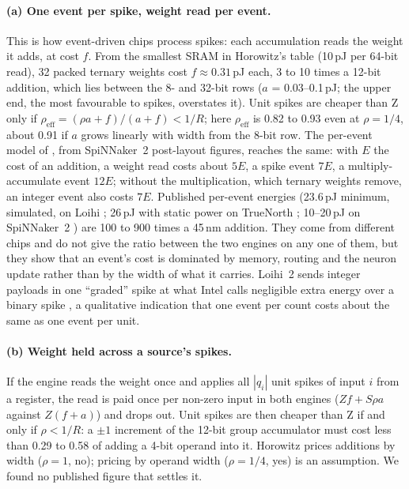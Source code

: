 \documentclass[11pt]{article}
\newcommand{\rhoeff}{\rho_{\mathrm{eff}}}
\begin{document}
\paragraph{(a) One event per spike, weight read per event.} This is how event-driven chips
process spikes: each accumulation reads the weight it adds, at cost $f$. From the smallest SRAM in
Horowitz's table (10\,pJ per 64-bit read), 32 packed ternary weights cost $f \approx 0.31$\,pJ
each, 3 to 10 times a 12-bit addition, which lies between the 8- and 32-bit rows ($a$ =
0.03--0.1\,pJ; the upper end, the most favourable to spikes, overstates it). Unit spikes are
cheaper than Z only if $\rhoeff = (\rho a + f)/(a + f) < 1/R$; here $\rhoeff$ is 0.82 to 0.93
even at $\rho = 1/4$, about 0.91 if $a$ grows linearly with width from the 8-bit row.
The per-event model of \citet{davidson2021}, from SpiNNaker~2 post-layout figures, reaches the
same: with $E$ the cost of an addition, a weight read costs about $5E$, a spike event $7E$, a
multiply-accumulate event $12E$; without the multiplication, which ternary weights remove, an
integer event also costs $7E$. Published per-event energies (23.6\,pJ minimum, simulated, on
Loihi \citep{davies2018loihi}; 26\,pJ with static power on TrueNorth
\citep{merolla2014truenorth}; 10--20\,pJ on SpiNNaker~2 \citep{hoppner2021spinnaker2}) are 100
to 900 times a 45\,nm addition. They come from different chips and do not give the ratio between
the two engines on any one of them, but they show that an event's cost is dominated by memory,
routing and the neuron update rather than by the width of what it carries. Loihi~2 sends integer
payloads in one ``graded'' spike at what Intel calls negligible extra energy over a binary spike
\citep{intel2021loihi2}, a qualitative indication that one event per count costs about the same
as one event per unit.

\paragraph{(b) Weight held across a source's spikes.} If the engine reads the weight once and
applies all $|q_i|$ unit spikes of input $i$ from a register, the read is paid once per non-zero
input in both engines ($Zf + S\rho a$ against $Z(f + a)$) and drops out. Unit spikes are then
cheaper than Z if and only if $\rho < 1/R$: a $\pm 1$ increment of the 12-bit group accumulator
must cost less than 0.29 to 0.58 of adding a 4-bit operand into it. Horowitz prices additions by
width ($\rho = 1$, no); pricing by operand width ($\rho = 1/4$, yes) is an assumption. We found
no published figure that settles it.
\end{document}
